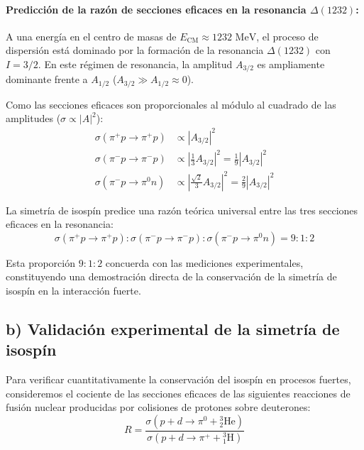\paragraph{Predicción de la razón de secciones eficaces en la resonancia $\Delta(1232)$:}

A una energía en el centro de masas de $E_{\text{CM}} \approx 1232\text{ MeV}$, el proceso de dispersión está dominado por la formación de la resonancia $\Delta(1232)$ con $I = 3/2$. En este régimen de resonancia, la amplitud $A_{3/2}$ es ampliamente dominante frente a $A_{1/2}$ ($A_{3/2} \gg A_{1/2} \approx 0$).

Como las secciones eficaces son proporcionales al módulo al cuadrado de las amplitudes ($\sigma \propto |A|^2$):
\begin{align}
    \sigma(\pi^+ p \to \pi^+ p) &\propto |A_{3/2}|^2 \\
    \sigma(\pi^- p \to \pi^- p) &\propto \left| \frac{1}{3} A_{3/2} \right|^2 = \frac{1}{9} |A_{3/2}|^2 \\
    \sigma(\pi^- p \to \pi^0 n) &\propto \left| \frac{\sqrt{2}}{3} A_{3/2} \right|^2 = \frac{2}{9} |A_{3/2}|^2
\end{align}

La simetría de isospín predice una razón teórica universal entre las tres secciones eficaces en la resonancia:
\begin{equation}
    \sigma(\pi^+ p \to \pi^+ p) : \sigma(\pi^- p \to \pi^- p) : \sigma(\pi^- p \to \pi^0 n) = 9 : 1 : 2
\end{equation}

Esta proporción $9:1:2$ concuerda con las mediciones experimentales, constituyendo una demostración directa de la conservación de la simetría de isospín en la interacción fuerte.

\newpage
\subsection*{b) Validación experimental de la simetría de isospín}

Para verificar cuantitativamente la conservación del isospín en procesos fuertes, consideremos el cociente de las secciones eficaces de las siguientes reacciones de fusión nuclear producidas por colisiones de protones sobre deuterones:
\begin{equation}
    R = \frac{\sigma(p + d \longrightarrow \pi^0 + {^3_2\text{He}})}{\sigma(p + d \longrightarrow \pi^+ + {^3_1\text{H}})}
\end{equation}

